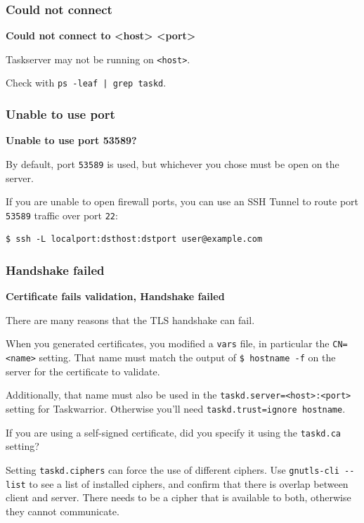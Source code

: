\documentclass[t,handout]{beamer}
\begin{document}
\begin{frame}[fragile]\frametitle{Could not connect}
    \textbf{Could not connect to <host> <port>}

    Taskserver may not be running on \verb+<host>+.

    Check with \verb+ps -leaf | grep taskd+.
\end{frame}

\begin{frame}[fragile]\frametitle{Unable to use port}
    \textbf{Unable to use port 53589?}

    By default, port \verb+53589+ is used, but whichever you chose must be open on the server.

    If you are unable to open firewall ports, you can use an SSH Tunnel to route port \verb+53589+ traffic over port \verb+22+:

    \begin{lstlisting}
$ ssh -L localport:dsthost:dstport user@example.com\end{lstlisting}
\end{frame}

\begin{frame}[fragile]\frametitle{Handshake failed}
    \textbf{Certificate fails validation, Handshake failed}

    There are many reasons that the TLS handshake can fail.

    When you generated certificates, you modified a \verb+vars+ file, in particular the \verb+CN=<name>+ setting. That name must match the output of  \verb+$ hostname -f+ on the server for the certificate to validate.

    Additionally, that name must also be used in the \verb+taskd.server=<host>:<port>+ setting for Taskwarrior. Otherwise you'll need \verb+taskd.trust=ignore hostname+.

    If you are using a self-signed certificate, did you specify it using the \verb+taskd.ca+ setting?

    Setting \verb+taskd.ciphers+ can force the use of different ciphers. Use \verb+gnutls-cli --list+ to see a list of installed ciphers, and confirm that there is overlap between client and server. There needs to be a cipher that is available to both, otherwise they cannot communicate.
\end{frame}
\end{document}
